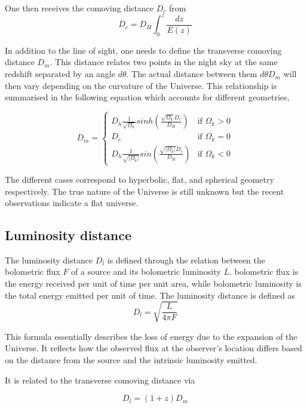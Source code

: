 \documentclass{article}
\begin{document}
One then receives the comoving distance $D_c$ from 
\begin{equation}
    D_c =D_H \int_0^z\frac{dz}{E(z)}
\end{equation}

In addition to the line of sight, one needs to define the transverse comoving distance $D_m$. This distance 
relates two points in the night sky at the same redshift separated by an angle $d\theta$. The actual distance
between them $d\theta D_m$ will then vary depending on the curvature of the Universe. This relationship is summarised in the following equation
which accounts for different geometries,

$$
D_m =
\begin{cases}
  D_h\frac{1}{\sqrt{\Omega_k}}sinh(\frac{\sqrt{\Omega_k}D_c}{D_H}) & \text{if } \Omega_k > 0 \\
  D_c& \text{if } \Omega_k = 0 \\
  D_h\frac{1}{\sqrt{|\Omega_k|}}sin(\frac{\sqrt{|\Omega_k|}D_c}{D_H}) & \text{if } \Omega_k < 0
\end{cases}
$$

The different cases correspond to hyperbolic, flat, and spherical geometry respectively. The true nature 
of the Universe is still unknown but the recent observations indicate a flat universe. 








\subsection{Luminosity distance}
The luminosity distance $D_l$ is defined through the relation between 
the bolometric flux $F$ of a source and its bolometric luminosity $L$. bolometric flux is the energy received per unit of time per unit area, while bolometric luminosity is the total energy emitted per unit of time.
The luminosity distance is defined as
\begin{equation}
    D_l = \sqrt{\frac{L}{4\pi F}}
\end{equation}

This formula essentially describes the loss of energy due to the expansion of the Universe. It reflects how the observed flux at the observer's location differs based on the distance from the source and the intrinsic luminosity emitted. 

It is related to the transverse comoving distance via 

\begin{equation}
    D_l = (1+z)D_m
\end{equation}
\end{document}
